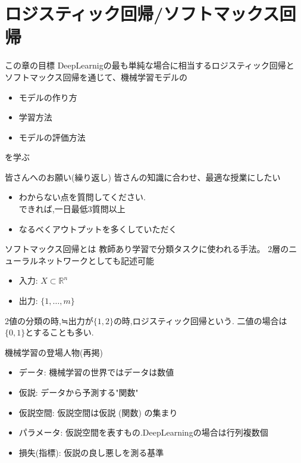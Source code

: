 \section{ロジスティック回帰/ソフトマックス回帰}
\begin{frame}{この章の目標}
DeepLearnigの最も単純な場合に相当するロジスティック回帰と
ソフトマックス回帰を通じて、機械学習モデルの
\begin{itemize}
\item  モデルの作り方
\item  学習方法
\item  モデルの評価方法
\end{itemize}
を学ぶ
\end{frame}

\begin{frame}{皆さんへのお願い(繰り返し)}
皆さんの知識に合わせ、最適な授業にしたい
\begin{itemize}
\item わからない点を質問してください. \\
      できれば,一日最低3質問以上
\item なるべくアウトプットを多くしていただく
\end{itemize}
\end{frame}

\begin{frame}{ソフトマックス回帰とは}
教師あり学習で分類タスクに使われる手法。
2層のニューラルネットワークとしても記述可能
\begin{itemize}
\item 入力: $X \subset \mathbb{R}^n$
\item 出力: $\{1, \ldots, m\}$
\end{itemize}

2値の分類の時,≒出力が$\{1, 2\}$の時,ロジスティック回帰という.
二値の場合は$\{0,1\}$とすることも多い.
\end{frame}

\begin{frame}{機械学習の登場人物(再掲)}

\begin{itemize}
\item データ: 機械学習の世界ではデータは数値
\item 仮説: データから予測する"関数"
\item 仮説空間: 仮説空間は仮説 (関数) の集まり
\item パラメータ: 仮説空間を表すもの.DeepLearningの場合は行列複数個
\item 損失(指標): 仮説の良し悪しを測る基準
\end{itemize}
\end{frame}

